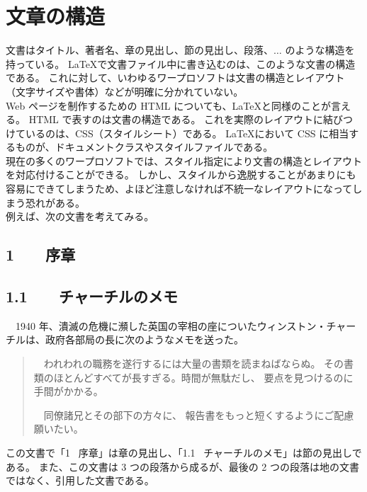 \section{文章の構造}
文書はタイトル、著者名、章の見出し、節の見出し、段落、$\ldots$ のような構造を持っている。
\LaTeX{}で文書ファイル中に書き込むのは、このような文書の構造である。
これに対して、いわゆるワープロソフトは文書の構造とレイアウト（文字サイズや書体）などが明確に分かれていない。\\

Web ページを制作するための HTML についても、\LaTeX{}と同様のことが言える。
HTML で表すのは文書の構造である。
これを実際のレイアウトに結びつけているのは、CSS（スタイルシート）である。
\LaTeX{}において CSS に相当するものが、ドキュメントクラスやスタイルファイルである。\\

現在の多くのワープロソフトでは、スタイル指定により文書の構造とレイアウトを対応付けることができる。
しかし、スタイルから逸脱することがあまりにも容易にできてしまうため、よほど注意しなければ不統一なレイアウトになってしまう恐れがある。\\

例えば、次の文書を考えてみる。
\begin{mdframed}[roundcorner=0.50zw,leftmargin=3.00zw,rightmargin=3.00zw,skipabove=0.40zw,skipbelow=0.40zw,innertopmargin=4.00pt,innerbottommargin=4.00pt,innerleftmargin=5.00pt,innerrightmargin=5.00pt,linecolor=gray!100,linewidth=0.50pt,backgroundcolor=gray!00]
  \setcounter{chapter}{1}
  \setcounter{section}{0}
  \section*{1 \ \ \ 序章}
  \subsection*{1.1 \ \ \ チャーチルのメモ}
  　1940 年、潰滅の危機に瀕した英国の宰相の座についたウィンストン・チャーチルは、政府各部局の長に次のようなメモを送った。
  \begin{quotation}
    　われわれの職務を遂行するには大量の書類を読まねばならぬ。
    その書類のほとんどすべてが長すぎる。時間が無駄だし、
    要点を見つけるのに手間がかかる。

    　同僚諸兄とその部下の方々に、
    報告書をもっと短くするようにご配慮願いたい。
  \end{quotation}
  \setcounter{chapter}{3}
  \setcounter{section}{6}
\end{mdframed}
この文書で「1 ~序章」は章の見出し、「1.1 ~チャーチルのメモ」は節の見出しである。
また、この文書は 3 つの段落から成るが、最後の 2 つの段落は地の文書ではなく、引用した文書である。\\

